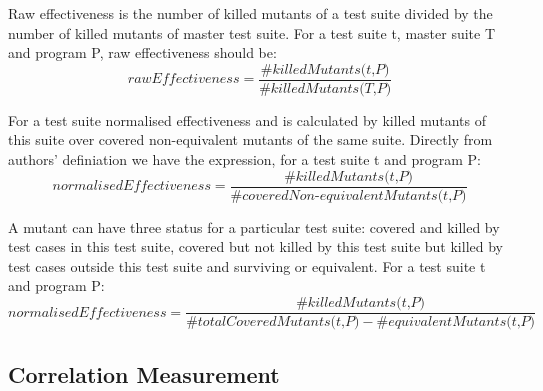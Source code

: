 Raw effectiveness is the number of killed mutants of a test suite divided by the number of killed mutants of master test suite. For a test suite t, master suite T and program P, raw effectiveness should be:
\[\textit{rawEffectiveness} = \frac{\#\textit{killedMutants(t,P)}}{\#\textit{killedMutants(T,P)}}\]

For a test suite normalised effectiveness and is calculated by killed mutants of this suite over covered non-equivalent mutants of the same suite. Directly from authors' definiation we have the expression, for a test suite t and program P:
\[\textit{normalisedEffectiveness} = \frac{\#\textit{killedMutants(t,P)}}{\#\textit{coveredNon-equivalentMutants(t,P)}}\]

A mutant can have three status for a particular test suite: covered and killed by test cases in this test suite, covered but not killed by this test suite but killed by test cases outside this test suite and surviving or equivalent. For a test suite t and program P:
\[\textit{normalisedEffectiveness} = \frac{\#\textit{killedMutants(t,P)}}{\#\textit{totalCoveredMutants(t,P)} - \#\textit{equivalentMutants(t,P)}}\]
\subsection{Correlation Measurement}